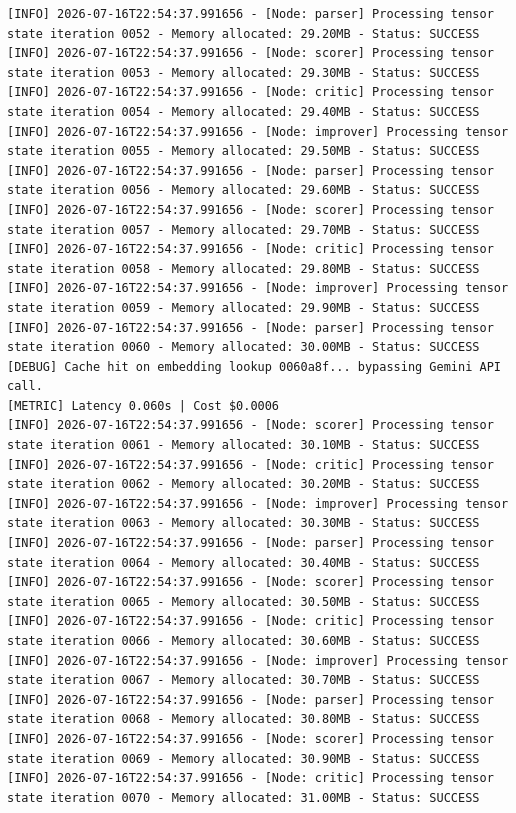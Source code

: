 \documentclass[10pt,journal,compsoc]{IEEEtran}
\begin{document}
\begin{verbatim}
[INFO] 2026-07-16T22:54:37.991656 - [Node: parser] Processing tensor state iteration 0052 - Memory allocated: 29.20MB - Status: SUCCESS
[INFO] 2026-07-16T22:54:37.991656 - [Node: scorer] Processing tensor state iteration 0053 - Memory allocated: 29.30MB - Status: SUCCESS
[INFO] 2026-07-16T22:54:37.991656 - [Node: critic] Processing tensor state iteration 0054 - Memory allocated: 29.40MB - Status: SUCCESS
[INFO] 2026-07-16T22:54:37.991656 - [Node: improver] Processing tensor state iteration 0055 - Memory allocated: 29.50MB - Status: SUCCESS
[INFO] 2026-07-16T22:54:37.991656 - [Node: parser] Processing tensor state iteration 0056 - Memory allocated: 29.60MB - Status: SUCCESS
[INFO] 2026-07-16T22:54:37.991656 - [Node: scorer] Processing tensor state iteration 0057 - Memory allocated: 29.70MB - Status: SUCCESS
[INFO] 2026-07-16T22:54:37.991656 - [Node: critic] Processing tensor state iteration 0058 - Memory allocated: 29.80MB - Status: SUCCESS
[INFO] 2026-07-16T22:54:37.991656 - [Node: improver] Processing tensor state iteration 0059 - Memory allocated: 29.90MB - Status: SUCCESS
[INFO] 2026-07-16T22:54:37.991656 - [Node: parser] Processing tensor state iteration 0060 - Memory allocated: 30.00MB - Status: SUCCESS
[DEBUG] Cache hit on embedding lookup 0060a8f... bypassing Gemini API call.
[METRIC] Latency 0.060s | Cost $0.0006
[INFO] 2026-07-16T22:54:37.991656 - [Node: scorer] Processing tensor state iteration 0061 - Memory allocated: 30.10MB - Status: SUCCESS
[INFO] 2026-07-16T22:54:37.991656 - [Node: critic] Processing tensor state iteration 0062 - Memory allocated: 30.20MB - Status: SUCCESS
[INFO] 2026-07-16T22:54:37.991656 - [Node: improver] Processing tensor state iteration 0063 - Memory allocated: 30.30MB - Status: SUCCESS
[INFO] 2026-07-16T22:54:37.991656 - [Node: parser] Processing tensor state iteration 0064 - Memory allocated: 30.40MB - Status: SUCCESS
[INFO] 2026-07-16T22:54:37.991656 - [Node: scorer] Processing tensor state iteration 0065 - Memory allocated: 30.50MB - Status: SUCCESS
[INFO] 2026-07-16T22:54:37.991656 - [Node: critic] Processing tensor state iteration 0066 - Memory allocated: 30.60MB - Status: SUCCESS
[INFO] 2026-07-16T22:54:37.991656 - [Node: improver] Processing tensor state iteration 0067 - Memory allocated: 30.70MB - Status: SUCCESS
[INFO] 2026-07-16T22:54:37.991656 - [Node: parser] Processing tensor state iteration 0068 - Memory allocated: 30.80MB - Status: SUCCESS
[INFO] 2026-07-16T22:54:37.991656 - [Node: scorer] Processing tensor state iteration 0069 - Memory allocated: 30.90MB - Status: SUCCESS
[INFO] 2026-07-16T22:54:37.991656 - [Node: critic] Processing tensor state iteration 0070 - Memory allocated: 31.00MB - Status: SUCCESS

\end{verbatim}
\end{document}
